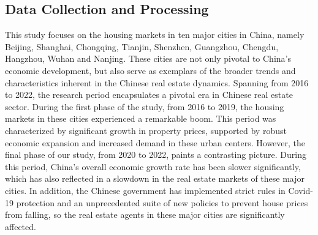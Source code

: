 \documentclass[11pt]{article}
\begin{document}
\subsection{Data Collection and Processing} \label{subsec:data_collection}

This study focuses on the housing markets in ten major cities in China, namely Beijing, Shanghai, Chongqing, Tianjin, Shenzhen, Guangzhou, Chengdu, Hangzhou, Wuhan and Nanjing. These cities are not only pivotal to China's economic development, but also serve as exemplars of the broader trends and characteristics inherent in the Chinese real estate dynamics. Spanning from 2016 to 2022, the research period encapsulates a pivotal era in Chinese real estate sector. During the first phase of the study, from 2016 to 2019, the housing markets in these cities experienced a remarkable boom. This period was characterized by significant growth in property prices, supported by robust economic expansion and increased demand in these urban centers. However, the final phase of our study, from 2020 to 2022, paints a contrasting picture. During this period, China's overall economic growth rate has been slower significantly, which has also reflected in a slowdown in the real estate markets of these major cities. In addition, the Chinese government has implemented strict rules in Covid-19 protection and an unprecedented suite of new policies to prevent house prices from falling, so the real estate agents in these major cities are significantly affected.
\end{document}
